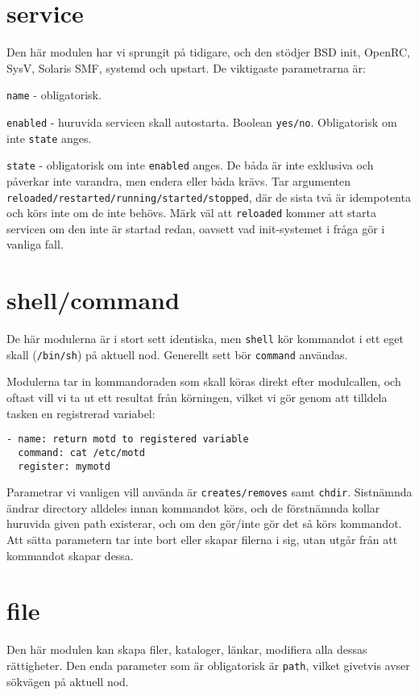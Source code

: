 \section{service}
Den här modulen har vi sprungit på tidigare, och den stödjer BSD init, OpenRC, SysV, Solaris SMF, systemd och upstart. De viktigaste parametrarna är:

\texttt{name} - obligatorisk.

\texttt{enabled} - huruvida servicen skall autostarta. Boolean \texttt{yes/no}. Obligatorisk om inte \texttt{state} anges.

\texttt{state} - obligatorisk om inte \texttt{enabled} anges. De båda är inte exklusiva och påverkar inte varandra,
men endera eller båda krävs. Tar argumenten \verb+reloaded/restarted/running/started/stopped+, där de sista två är idempotenta och körs inte om de inte behövs. Märk väl att \verb+reloaded+ kommer att starta servicen om den inte 
är startad redan, oavsett vad init-systemet i fråga gör i vanliga fall.

\section{shell/command}
De här modulerna är i stort sett identiska, men \texttt{shell} kör kommandot i ett eget skall (\texttt{/bin/sh}) på 
aktuell nod. Generellt sett bör \texttt{command} användas.

Modulerna tar in kommandoraden som skall köras direkt efter modulcallen, och oftast vill vi ta ut ett resultat från 
körningen, vilket vi gör genom att tilldela tasken en registrerad variabel:

\begin{verbatim}
- name: return motd to registered variable
  command: cat /etc/motd
  register: mymotd
\end{verbatim}

Parametrar vi vanligen vill använda är \texttt{creates/removes} samt \texttt{chdir}. Sistnämnda ändrar directory alldeles innan kommandot körs, och de förstnämnda kollar huruvida given path existerar, och om den gör/inte gör det så körs kommandot. Att sätta parametern tar inte bort eller skapar filerna i sig, utan utgår från att kommandot skapar dessa.

\section{file}
Den här modulen kan skapa filer, kataloger, länkar, modifiera alla dessas rättigheter.
Den enda parameter som är obligatorisk är \texttt{path}, vilket givetvis avser sökvägen på aktuell nod.


